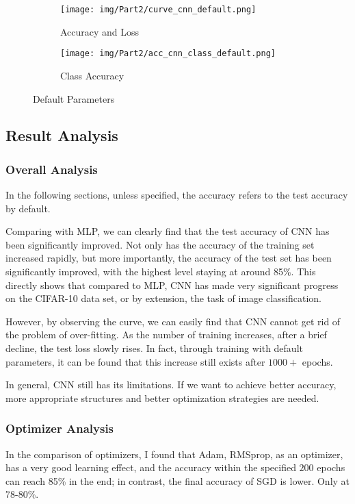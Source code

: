 \begin{figure}[!htp]
  \centering
  \begin{subfigure}[b]{1\textwidth}
    \texttt{[image: img/Part2/curve\_cnn\_default.png]}
    \caption{Accuracy and Loss}
  \end{subfigure}
  \begin{subfigure}[b]{1\textwidth}
    \texttt{[image: img/Part2/acc\_cnn\_class\_default.png]}
    \caption{Class Accuracy}
  \end{subfigure}
  \caption{Default Parameters}
  \label{fig:p2_default}
\end{figure}

\subsection{Result Analysis}

\subsubsection{Overall Analysis}

In the following sections, unless specified, the accuracy refers to the test accuracy by default.

Comparing with MLP, we can clearly find that the test accuracy of CNN has been significantly improved.
Not only has the accuracy of the training set increased rapidly, but more importantly, the accuracy of the test set has been significantly improved, with the highest level staying at around 85\%.
This directly shows that compared to MLP, CNN has made very significant progress on the CIFAR-10 data set, or by extension, the task of image classification.

However, by observing the curve, we can easily find that CNN cannot get rid of the problem of over-fitting.
As the number of training increases, after a brief decline, the test loss slowly rises. In fact, through training with default parameters, it can be found that this increase still exists after $1000+$ epochs.

In general, CNN still has its limitations. If we want to achieve better accuracy, more appropriate structures and better optimization strategies are needed.

\subsubsection{Optimizer Analysis}

In the comparison of optimizers, I found that Adam, RMSprop, as an optimizer, has a very good learning effect,
and the accuracy within the specified $200$ epochs can reach 85\% in the end; in contrast, the final accuracy of SGD is lower. Only at 78-80\%.

